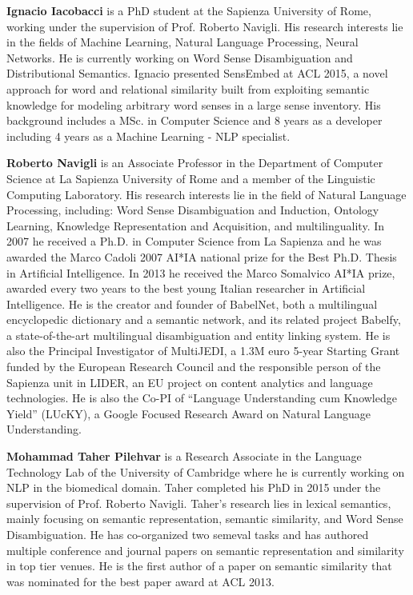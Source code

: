{\bfseries Ignacio Iacobacci} is a PhD student at the Sapienza University of Rome, working under the supervision of Prof. Roberto Navigli. His research interests lie in the fields of Machine Learning, Natural Language Processing, Neural Networks. He is currently working on Word Sense Disambiguation and Distributional Semantics. Ignacio presented SensEmbed at ACL 2015, a novel approach for word and relational similarity built from exploiting semantic knowledge for modeling arbitrary word senses in a large sense inventory. His background includes a MSc. in Computer Science and 8 years as a developer including 4 years as a Machine Learning - NLP specialist.

{\bfseries Roberto Navigli} is an Associate Professor in the Department of Computer Science at La Sapienza University of Rome and a member of the Linguistic Computing Laboratory. His research interests lie in the field of Natural Language Processing, including: Word Sense Disambiguation and Induction, Ontology Learning, Knowledge Representation and Acquisition, and multilinguality. In 2007 he received a Ph.D. in Computer Science from La Sapienza and he was awarded the Marco Cadoli 2007 AI*IA national prize for the Best Ph.D. Thesis in Artificial Intelligence. In 2013 he received the Marco Somalvico AI*IA prize, awarded every two years to the best young Italian researcher in Artificial Intelligence. He is the creator and founder of BabelNet, both a multilingual encyclopedic dictionary and a semantic network, and its related project Babelfy, a state-of-the-art multilingual disambiguation and entity linking system. He is also the Principal Investigator of MultiJEDI, a 1.3M euro 5-year Starting Grant funded by the European Research Council and the responsible person of the Sapienza unit in LIDER, an EU project on content analytics and language technologies. He is also the Co-PI of ``Language Understanding cum Knowledge Yield'' (LUcKY), a Google Focused Research Award on Natural Language Understanding.

{\bfseries Mohammad Taher Pilehvar} is a Research Associate in the Language Technology Lab of the University of Cambridge where he is currently working on NLP in the biomedical domain. Taher completed his PhD in 2015 under the supervision of Prof. Roberto Navigli. Taher's research lies in lexical semantics, mainly focusing on semantic representation, semantic similarity, and Word Sense Disambiguation. He has co-organized two semeval tasks and has authored multiple conference and journal papers on semantic representation and similarity in top tier venues. He is the first author of a paper on semantic similarity that was nominated for the best paper award at ACL 2013.
